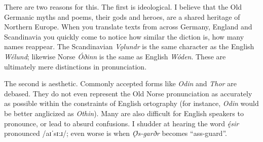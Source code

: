       There are two reasons for this.  The first is ideological.  I believe that the Old Germanic myths and poems, their gods and heroes, are a shared heritage of Northern Europe.  When you translate texts from across Germany, England and Scandinavia you quickly come to notice how similar the diction is, how many names reappear. The Scandinavian \emph{Vǫlundr} is the same character as the English \emph{Wélund}; likewise Norse \emph{Óðinn} is the same as English \emph{Wóden}.  These are ultimately mere distinctions in pronunciation.

      The second is aesthetic.  Commonly accepted forms like \emph{Odin} and \emph{Thor} are debased.  They do not even represent the Old Norse pronunciation as accurately as possible within the constraints of English ortography (for instance, \emph{Odin} would be better anglicized as \emph{Othin}).  Many are also difficult for English speakers to pronounce, or lead to absurd confusions.  I shudder at hearing the word \emph{ę́sir} pronounced /aɪˈsɪ:ɹ/; even worse is when \emph{Ǫ́s-garðr} becomes “ass-guard”.

  \printbibliography%
